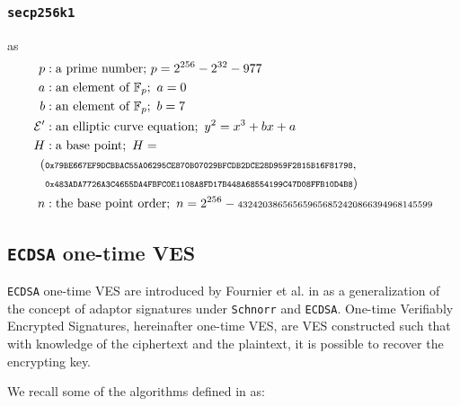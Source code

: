 \documentclass{llncs}
\begin{document}
\subsubsection{\texttt{secp256k1}} as
\begin{equation}
\begin{split}
    p&: \text{a prime number;}\ p = 2^{256} - 2^{32} - 977 \\
    a&: \text{an element of } \mathbb{F}_p;\ a = 0 \\
    b&: \text{an element of } \mathbb{F}_p;\ b = 7 \\
    \mathcal{E}'&: \text{an elliptic curve equation};\ y^2 = x^3 + bx + a \\
    H&: \text{a base point};\ H = \\ (&\texttt{\scriptsize0x79BE667EF9DCBBAC55A06295CE870B07029BFCDB2DCE28D959F2815B16F81798},\\ &\texttt{\scriptsize0x483ADA7726A3C4655DA4FBFC0E1108A8FD17B448A68554199C47D08FFB10D4B8}) \\
    n&: \text{the base point order};\ n = 2^{256} - \text{\scriptsize{432420386565659656852420866394968145599}} \\
\end{split}
\end{equation}

\subsection{\texttt{ECDSA} one-time VES}
\label{oneTimeEcdsaVES}
\texttt{ECDSA} one-time VES are introduced by Fournier et al. in \cite{oneTimeVES} as a generalization of the concept of adaptor signatures under \texttt{Schnorr} \cite{Schnorr:1989:EIS:646754.705037} and \texttt{ECDSA}. One-time Verifiably Encrypted Signatures, hereinafter one-time VES, are VES constructed such that with knowledge of the ciphertext and the plaintext, it is possible to recover the encrypting key.

We recall some of the algorithms defined in \cite{oneTimeVES} as:
\end{document}
